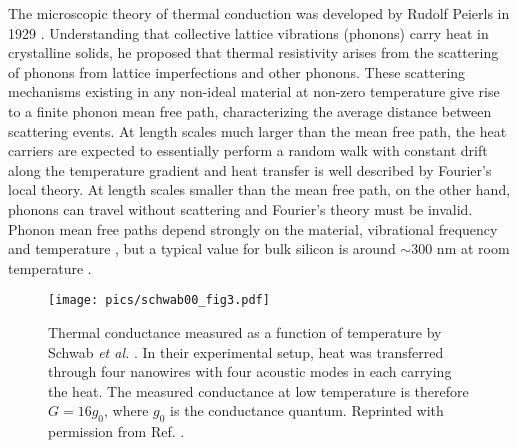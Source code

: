 The microscopic theory of thermal conduction was developed by Rudolf Peierls in 1929 \cite{peierls29}. Understanding that collective lattice vibrations (phonons) carry heat in crystalline solids, he proposed that thermal resistivity arises from the scattering of phonons from lattice imperfections and other phonons. These scattering mechanisms existing in any non-ideal material at non-zero temperature give rise to a finite phonon mean free path, characterizing the average distance between scattering events. At length scales much larger than the mean free path, the heat carriers are expected to essentially perform a random walk with constant drift along the temperature gradient and heat transfer is well described by Fourier's local theory. At length scales smaller than the mean free path, on the other hand, phonons can travel without scattering and Fourier's theory must be invalid. Phonon mean free paths depend strongly on the material, vibrational frequency and temperature \cite{}, but a typical value for bulk silicon is around $\sim 300$ nm at room temperature \cite{ju99}. 



\begin{figure}
\begin{center}
 \texttt{[image: pics/schwab00\_fig3.pdf]}
 \caption{Thermal conductance measured as a function of temperature by Schwab \textit{et al.} \cite{schwab00}. In their experimental setup, heat was transferred through four nanowires with four acoustic modes in each carrying the heat. The measured conductance at low temperature is therefore $G=16g_0$, where $g_0$ is the conductance quantum. Reprinted with permission from Ref. \cite{schwab00}.}
\label{fig:intro_schwab}
\end{center}
\end{figure}

